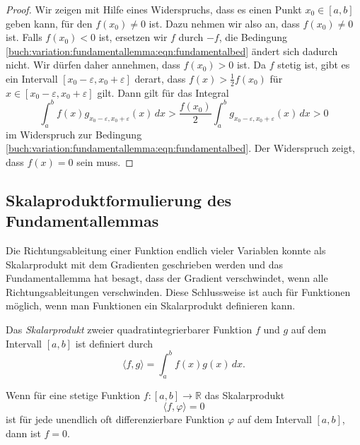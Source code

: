 \begin{proof}
Wir zeigen mit Hilfe eines Widerspruchs, dass es einen Punkt $x_0\in[a,b]$
geben kann, für den $f(x_0)\ne 0$ ist.
Dazu nehmen wir also an, dass $f(x_0)\ne 0$ ist.
Falls $f(x_0)<0$ ist, ersetzen wir $f$ durch $-f$, 
die Bedingung
\eqref{buch:variation:fundamentallemma:eqn:fundamentalbed}
ändert sich dadurch nicht.
Wir dürfen daher annehmen, dass $f(x_0)>0$ ist.
Da $f$ stetig ist, gibt es ein Intervall $[x_0-\varepsilon,x_0+\varepsilon]$
derart, dass $f(x)> \frac12 f(x_0)$ für
$x\in[x_0-\varepsilon,x_0+\varepsilon]$ gilt.
Dann gilt für das Integral
\[
\int_a^b
f(x)
g_{x_0-\varepsilon,x_0+\varepsilon} (x)
\,dx
>
\frac{f(x_0)}{2}
\int_a^b
g_{x_0-\varepsilon,x_0+\varepsilon} (x)
\,dx
>
0
\]
im Widerspruch zur Bedingung
\eqref{buch:variation:fundamentallemma:eqn:fundamentalbed}.
Der Widerspruch zeigt, dass $f(x)=0$ sein muss.
\end{proof}

%
%
\subsection{Skalaproduktformulierung des Fundamentallemmas}
Die Richtungsableitung einer Funktion endlich vieler Variablen 
konnte als Skalarprodukt mit dem Gradienten geschrieben werden und
das Fundamentallemma hat besagt, dass der Gradient verschwindet,
wenn alle Richtungsableitungen verschwinden.
Diese Schlussweise ist auch für Funktionen möglich, wenn man Funktionen
ein Skalarprodukt definieren kann.

\begin{definition}[$L^2$-Skalarprodukt]
Das {\em Skalarprodukt} zweier quadratintegrierbarer Funktion $f$ und $g$
auf dem Intervall $[a,b]$ ist definiert durch
\[
\langle f,g\rangle
=
\int_a^b f(x)g(x)\,dx.
\]
\end{definition}

\begin{satz}
Wenn für eine stetige Funktion $f\colon[a,b]\to\mathbb{R}$ das Skalarprodukt
\[
\langle f,\varphi\rangle = 0
\]
ist für jede unendlich oft differenzierbare Funktion $\varphi$ auf dem
Intervall $[a,b]$, dann ist $f=0$.
\end{satz}


